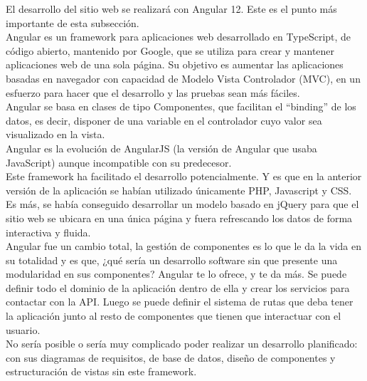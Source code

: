 El desarrollo del sitio web se realizará con Angular 12. Este es el punto más importante de esta subsección.
\\Angular es un framework para aplicaciones web desarrollado en TypeScript, de código abierto, mantenido por Google, que se utiliza para crear y mantener aplicaciones web de una sola página. Su objetivo es aumentar las aplicaciones basadas en navegador con capacidad de Modelo Vista Controlador (MVC), en un esfuerzo para hacer que el desarrollo y las pruebas sean más fáciles.
\\Angular se basa en clases de tipo Componentes, que facilitan el ``binding'' de los datos, es decir, disponer de una variable en el controlador cuyo valor sea visualizado en la vista.
\\Angular es la evolución de AngularJS (la versión de Angular que usaba JavaScript) aunque incompatible con su predecesor.
\\Este framework ha facilitado el desarrollo potencialmente. Y es que en la anterior versión de la aplicación se habían utilizado únicamente PHP, Javascript y CSS. Es más, se había conseguido desarrollar un modelo basado en jQuery para que el sitio web se ubicara en una única página y fuera refrescando los datos de forma interactiva y fluida.
\\Angular fue un cambio total, la gestión de componentes es lo que le da la vida en su totalidad y es que, ¿qué sería un desarrollo software sin que presente una modularidad en sus componentes? Angular te lo ofrece, y te da más. Se puede definir todo el dominio de la aplicación dentro de ella y crear los servicios para contactar con la API. Luego se puede definir el sistema de rutas que deba tener la aplicación junto al resto de componentes que tienen que interactuar con el usuario.
\\No sería posible o sería muy complicado poder realizar un desarrollo planificado: con sus diagramas de requisitos, de base de datos, diseño de componentes y estructuración de vistas sin este framework.


